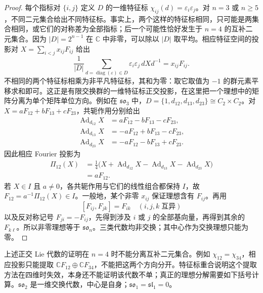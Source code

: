 \begin{proof}
	每个指标对 \(\{i,j\}\) 定义 \(D\) 的一维特征标 \(\chi_{ij}(d)=\varepsilon_i\varepsilon_j\)。对 \(n=3\) 或 \(n\ge5\)，不同二元集合给出不同特征标。事实上，两个这样的特征标相同，只可能是两集合相同，或它们的对称差为全部指标；后一个可能性恰好发生于 \(n=4\) 的互补二元集合。因为 \(|D|=2^{n-1}\) 在 \(\mathbb C\) 中非零，可以除以 \(|D|\) 取平均。相应特征空间的投影对 \(X=\sum_{i<j}x_{ij}F_{ij}\) 给出
	\[
		\frac1{|D|}\sum_{d=\operatorname{diag}(\varepsilon)\in D} \varepsilon_i\varepsilon_j\,dXd^{-1}=x_{ij}F_{ij}.
	\]
	不相同的两个特征标相乘为非平凡特征标，其和为零：取它取值为 \(-1\) 的群元素平移求和即可。这正是有限交换群的一维特征标正交投影，在这里把一个理想中的矩阵分离为单个矩阵单位方向。例如在 \(\mathfrak{so}_3\) 中，\(D=\{1,d_{12},d_{13},d_{23}\}\cong C_2\times C_2\)。对 \(X=aF_{12}+bF_{13}+cF_{23}\)，共轭作用分别给出
	\[
		\begin{aligned}
			\operatorname{Ad}_{d_{12}}X&=aF_{12}-bF_{13}-cF_{23},\\
			\operatorname{Ad}_{d_{13}}X&=-aF_{12}+bF_{13}-cF_{23},\\
			\operatorname{Ad}_{d_{23}}X&=-aF_{12}-bF_{13}+cF_{23}.
		\end{aligned}
	\]
	因此相应 Fourier 投影为
	\[
		\begin{aligned}
			\Pi_{12}(X)&=\frac14\bigl(X+\operatorname{Ad}_{d_{12}}X -\operatorname{Ad}_{d_{13}}X-\operatorname{Ad}_{d_{23}}X\bigr)\\
			&=aF_{12}.
		\end{aligned}
	\]
	若 \(X\in I\) 且 \(a\ne0\)，各共轭作用与它们的线性组合都保持 \(I\)，故 \(F_{12}=a^{-1}\Pi_{12}(X)\in I\)。一般地，某个非零 \(x_{ij}\) 保证理想含有 \(F_{ij}\)。再用
	\[
		[F_{ij},F_{jk}]=F_{ik}\quad(i,j,k\;\text{互异})
	\]
	以及反对称记号 \(F_{ji}=-F_{ij}\)，先得到涉及 \(i\) 或 \(j\) 的全部基向量，再得到其余的 \(F_{k\ell}\)。所以非零理想等于 \(\mathfrak{so}_n\)。三类代数均非交换；其中心作为交换理想只能为零。
\end{proof}

上述正交 Lie 代数的证明在 \(n=4\) 时不能分离互补二元集合。例如 \(\chi_{12}=\chi_{34}\)，相应投影只能提取 \(\mathbb CF_{12}\oplus\mathbb CF_{34}\)，不能把这两个方向分开。特征标重合说明这个提取方法在四维时失效，本身还不能证明该代数不单；真正的理想分解需要如下括号计算。\(\mathfrak{so}_2\) 是一维交换代数，中心是自身；\(\mathfrak{so}_1=\mathfrak{sl}_1=0\)。

